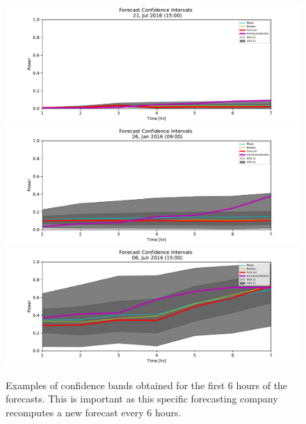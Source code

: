 \documentclass[10pt,twocolumn,letterpaper]{article}
\begin{document}
\begin{figure}[t]
\begin{center}
   \includegraphics[width=0.9\linewidth]{6hr_forecast_CI_618.pdf}
   \includegraphics[width=0.9\linewidth]{6hr_forecast_CI_38.pdf}
   \includegraphics[width=0.9\linewidth]{6hr_forecast_CI_459.pdf}
\end{center}
   \caption{ Examples of confidence bands obtained for the first 6 hours of the forecasts. This is important as this specific forecasting company recomputes a new forecast every 6 hours.}
\label{fig:6hr}
\end{figure}
\end{document}
